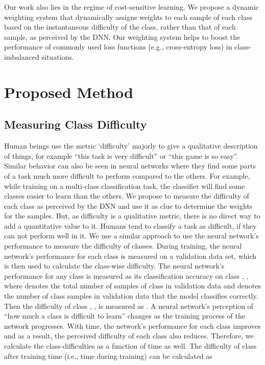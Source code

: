 \documentclass[runningheads]{llncs}
\begin{document}
Our work also lies in the regime of cost-sensitive learning. We propose a 
dynamic weighting system that dynamically assigns weights to each sample of each
class based on the instantaneous difficulty of the class, rather than that of 
each sample, as perceived by the DNN. Our weighting system helps to boost the 
performance
of commonly used loss functions (e.g., cross-entropy loss) in class-imbalanced 
situations.
\section{Proposed Method}



\subsection{Measuring Class Difficulty}

Human beings use the metric ‘difficulty’ majorly to give a qualitative 
description
of things, for example “this task is very difficult” or “this game is so easy”. 
Similar
behavior can also be seen in neural networks where they find some parts of a 
task
much more difficult to perform compared to the others. For example, while 
training on a multi-class classification task, the classifier will find some classes easier to learn than the others. 
We propose to measure the difficulty of
each class as perceived by the DNN and use it as clue to determine the weights 
for
the samples. But, as difficulty is a qualitative metric, there is no direct way 
to add a
quantitative value to it. Humans tend to classify a task as difficult, if they 
can not perform well in it. We use a similar approach to use the neural 
network’s performance to
measure the difficulty of classes. During training, the neural network’s 
performance
for each class is measured on a validation data set, which is then used to 
calculate the
class-wise difficulty. The neural network’s performance for any class  is 
measured as its classification accuracy on class , ,
where  denotes the total number of samples of class  in validation data 
and 
denotes the number of class  samples in validation data that the model 
classifies
correctly. Then the difficulty of class , , is measured as .
A neural network’s perception of “how much a class is difficult to learn” 
changes as
the training process of the network progresses. With time, the network’s 
performance for each class improves and as a result, the 
perceived difficulty of
each class also reduces. Therefore, we calculate the class-difficulties as a 
function of
time as well. The difficulty of class  after training time (i.e., time during 
training) 
can be calculated as
\end{document}
